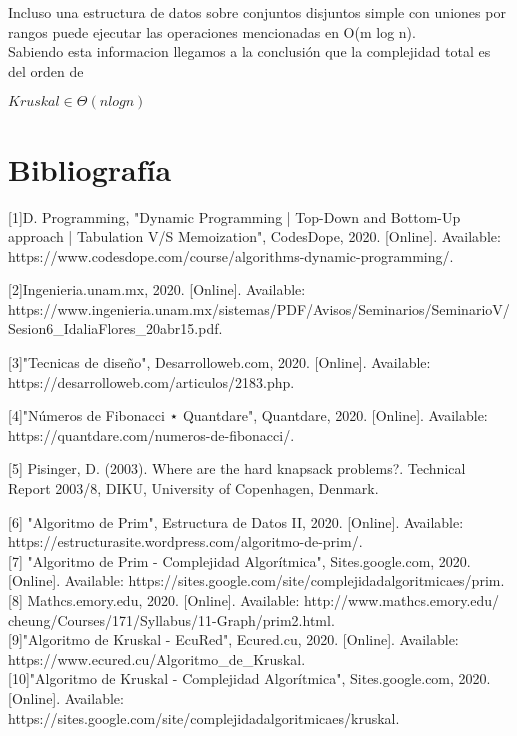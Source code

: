 \documentclass[12pt,twoside]{article}
\begin{document}
Incluso una estructura de datos sobre conjuntos disjuntos simple con uniones por rangos puede
ejecutar las operaciones mencionadas en O(m log n). \\

Sabiendo esta informacion llegamos a la conclusión que la complejidad total es del
orden de \\
\begin{center}
    $Kruskal \in \Theta(nlogn)$
\end{center}




\newpage
\section{Bibliograf\'ia}

[1]D. Programming, "Dynamic Programming | Top-Down and Bottom-Up approach | Tabulation V/S Memoization", CodesDope, 2020. [Online]. Available: https://www.codesdope.com/course/algorithms-dynamic-programming/.\newline

[2]Ingenieria.unam.mx, 2020. [Online]. Available: \newline https://www.ingenieria.unam.mx/sistemas/PDF/Avisos/Seminarios\newline/SeminarioV/Sesion6_IdaliaFlores_20abr15.pdf.\newline

[3]"Tecnicas de diseño", Desarrolloweb.com, 2020. [Online]. Available:\\ https://desarrolloweb.com/articulos/2183.php. \newline

[4]"Números de Fibonacci ⋆ Quantdare", Quantdare, 2020. [Online]. Available: https://quantdare.com/numeros-de-fibonacci/.\newline

[5] Pisinger, D. (2003). Where are the hard knapsack problems?. Technical Report 2003/8, DIKU, University of Copenhagen, Denmark.\newline

[6] "Algoritmo de Prim", Estructura de Datos II, 2020. [Online]. Available: https://estructurasite.wordpress.com/algoritmo-de-prim/.\\

[7] "Algoritmo de Prim - Complejidad Algorítmica", Sites.google.com, 2020. [Online]. Available: https://sites.google.com/site/complejidadalgoritmicaes/prim.\\

[8] Mathcs.emory.edu, 2020. [Online]. Available: http://www.mathcs.emory.edu/\\cheung/Courses/171/Syllabus/11-Graph/prim2.html.\\

[9]"Algoritmo de Kruskal - EcuRed", Ecured.cu, 2020. [Online]. Available: https://www.ecured.cu/Algoritmo_de_Kruskal.\\

[10]"Algoritmo de Kruskal - Complejidad Algorítmica", Sites.google.com, 2020. [Online]. Available: https://sites.google.com/site/complejidadalgoritmicaes/kruskal.
\end{document}
